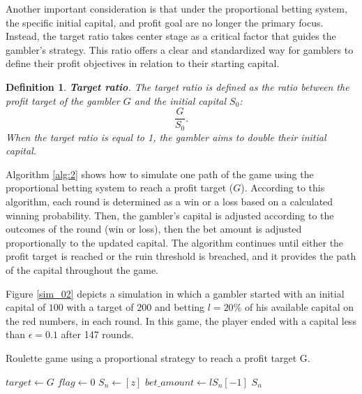 \documentclass[11pt,twoside]{article}
\newtheorem{Definition}{Definition}
\numberwithin{Theorem}{section}
\numberwithin{Definition}{section}
\numberwithin{Lemma}{section}
\numberwithin{Algorithm}{section}
\numberwithin{equation}{section}
\begin{document}
Another important consideration is that under the proportional betting system, the specific initial capital, and profit goal are no longer the primary focus. Instead, the target ratio takes center stage as a critical factor that guides the gambler's strategy. This ratio offers a clear and standardized way for gamblers to define their profit objectives in relation to their starting capital.

\begin{Definition}
    \textbf{Target ratio}. The target ratio is defined as the ratio between the profit target of the gambler $G$ and the initial capital $S_{0}$:
    $$\frac{G}{S_{0}}.$$
When the target ratio is equal to 1, the gambler aims to double their initial capital.
\end{Definition}

Algorithm \ref{alg:2} shows how to simulate one path of the game using the proportional betting system to reach a profit target ($G$). According to this algorithm, each round is determined as a win or a loss based on a calculated winning probability. Then, the gambler's capital is adjusted according to the outcomes of the round (win or loss), then the bet amount is adjusted proportionally to the updated capital. The algorithm continues until either the profit target is reached or the ruin threshold is breached, and it provides the path of the capital throughout the game.

Figure \ref{sim_02} depicts a simulation in which a gambler started with an initial capital of $100$ with a target of $200$ and betting $l =20\%$ of his available capital on the red numbers, in each round. In this game, the player ended with a capital less than $\epsilon = 0.1$ after 147 rounds.
\begin{algorithm}
\caption{Roulette game using a proportional strategy to reach a profit target G.} \label{alg:2}
\SetAlgoLined
{}

$target \gets G$\;
$flag \gets 0$\;
$S_{n} \gets [z]$\;
$bet\_amount \gets lS_{n}[-1]$\;
\Return $S_{n}$\;
\end{algorithm}
\end{document}
